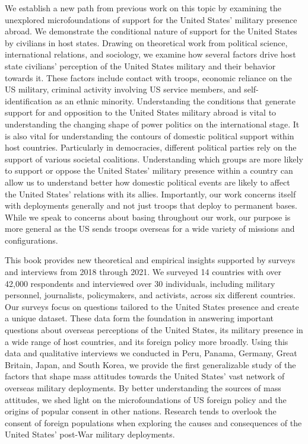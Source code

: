 We establish a new path from previous work on this topic by examining the unexplored microfoundations of support for the United States' military presence abroad. We demonstrate the conditional nature of support for the United States by civilians in host states. Drawing on theoretical work from political science, international relations, and sociology, we examine how several factors drive host state civilians' perception of the United States military and their behavior towards it. These factors include contact with troops, economic reliance on the US military, criminal activity involving US service members, and self-identification as an ethnic minority. Understanding the conditions that generate support for and opposition to the United States military abroad is vital to understanding the changing shape of power politics on the international stage. It is also vital for understanding the contours of domestic political support within host countries. Particularly in democracies, different political parties rely on the support of various societal coalitions. Understanding which groups are more likely to support or oppose the United States' military presence within a country can allow us to understand better how domestic political events are likely to affect the United States' relations with its allies. Importantly, our work concerns itself with deployments generally and not just troops that deploy to permanent bases. While we speak to concerns about basing throughout our work, our purpose is more general as the US sends troops overseas for a wide variety of missions and configurations.\cite{Allen2011}

This book provides new theoretical and empirical insights supported by surveys and interviews from 2018 through 2021. We surveyed 14 countries with over 42,000 respondents and interviewed over 30 individuals, including military personnel, journalists, policymakers, and activists, across six different countries. Our surveys focus on questions tailored to the United States presence and create a unique dataset. These data form the foundation in answering important questions about overseas perceptions of the United States, its military presence in a wide range of host countries, and its foreign policy more broadly. Using this data and qualitative interviews we conducted in Peru, Panama, Germany, Great Britain, Japan, and South Korea, we provide the first generalizable study of the factors that shape mass attitudes towards the United States' vast network of overseas military deployments. By better understanding the sources of mass attitudes, we shed light on the microfoundations of US foreign policy and the origins of popular consent in other nations. Research tends to overlook the consent of foreign populations when exploring the causes and consequences of the United States' post-War military deployments. 

